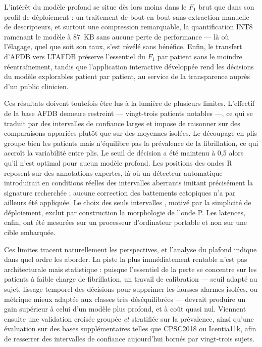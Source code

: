 L'intérêt du modèle profond se situe dès lors moins dans le \(F_1\) brut que dans son profil de déploiement : un traitement de bout en bout sans extraction manuelle de descripteurs, et surtout une compression remarquable, la quantification INT8 ramenant le modèle à 87~KB sans aucune perte de performance — là où l'élagage, quel que soit son taux, s'est révélé sans bénéfice. Enfin, le transfert d'AFDB vers LTAFDB préserve l'essentiel du \(F_1\) par patient sans le moindre réentraînement, tandis que l'application interactive développée rend les décisions du modèle explorables patient par patient, au service de la transparence auprès d'un public clinicien.

Ces résultats doivent toutefois être lus à la lumière de plusieurs limites. L'effectif de la base AFDB demeure restreint — vingt-trois patients notables —, ce qui se traduit par des intervalles de confiance larges et impose de raisonner sur des comparaisons appariées plutôt que sur des moyennes isolées. Le découpage en plis groupe bien les patients mais n'équilibre pas la prévalence de la fibrillation, ce qui accroît la variabilité entre plis. Le seuil de décision a été maintenu à 0,5 alors qu'il n'est optimal pour aucun modèle profond. Les positions des ondes R reposent sur des annotations expertes, là où un détecteur automatique introduirait en conditions réelles des intervalles aberrants imitant précisément la signature recherchée ; aucune correction des battements ectopiques n'a par ailleurs été appliquée. Le choix des seuls intervalles \RR{}, motivé par la simplicité de déploiement, exclut par construction la morphologie de l'onde P. Les latences, enfin, ont été mesurées sur un processeur d'ordinateur portable et non sur une cible embarquée.

Ces limites tracent naturellement les perspectives, et l'analyse du plafond indique dans quel ordre les aborder. La piste la plus immédiatement rentable n'est pas architecturale mais statistique : puisque l'essentiel de la perte se concentre sur les patients à faible charge de fibrillation, un travail de calibration — seuil adapté au sujet, lissage temporel des décisions pour supprimer les fausses alarmes isolées, ou métrique mieux adaptée aux classes très déséquilibrées — devrait produire un gain supérieur à celui d'un modèle plus profond, et à coût quasi nul. Viennent ensuite une validation croisée groupée \emph{et} stratifiée sur la prévalence, ainsi qu'une évaluation sur des bases supplémentaires telles que CPSC2018 ou Icentia11k, afin de resserrer des intervalles de confiance aujourd'hui bornés par vingt-trois sujets.

